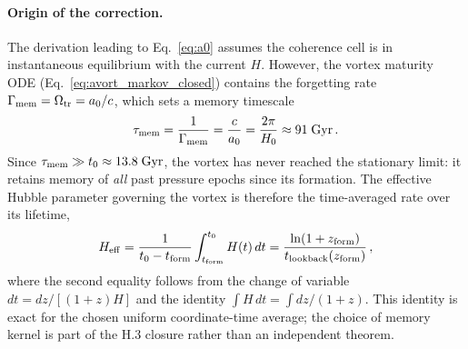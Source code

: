 \documentclass[11pt]{article}
\begin{document}
\paragraph{Origin of the correction.}
The derivation leading to Eq.~\eqref{eq:a0} assumes the coherence cell is in instantaneous equilibrium with the current $H$.  However, the vortex maturity ODE (Eq.~\eqref{eq:avort_markov_closed}) contains the forgetting rate $\Gamma_{\rm mem}=\Omega_{\rm tr}=a_0/c$, which sets a memory timescale
\begin{equation}\label{eq:tau_mem}
\tau_{\rm mem}=\frac{1}{\Gamma_{\rm mem}}=\frac{c}{a_0}=\frac{2\pi}{H_0}\approx 91\;\mathrm{Gyr}\,.
\end{equation}
Since $\tau_{\rm mem}\gg t_0\approx 13.8\;\mathrm{Gyr}$, the vortex has never reached the stationary limit: it retains memory of \emph{all} past pressure epochs since its formation.  The effective Hubble parameter governing the vortex is therefore the time-averaged rate over its lifetime,
\begin{equation}\label{eq:Heff}
H_{\rm eff}
= \frac{1}{t_0-t_{\rm form}}\int_{t_{\rm form}}^{t_0}H(t)\,dt
= \frac{\ln(1+z_{\rm form})}{t_{\rm lookback}(z_{\rm form})}\,,
\end{equation}
where the second equality follows from the change of variable $dt = dz/[(1+z)H]$ and the identity $\int H\,dt = \int dz/(1+z)$.  This identity is exact for the chosen uniform coordinate-time average; the choice of memory kernel is part of the H.3 closure rather than an independent theorem.
\end{document}
